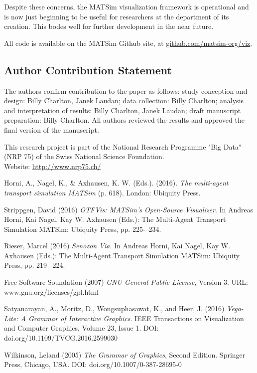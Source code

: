 \documentclass[Afour,sagev,times]{sagej}
\begin{document}
Despite these concerns, the MATSim visualization framework is operational and is now just beginning to be useful for researchers at the department of its creation. This bodes well for further development in the near future.

All code is available on the MATSim Github site, at \url{github.com/matsim-org/viz}.

\subsection{Author Contribution Statement}

The authors confirm contribution to the paper as follows: study conception and
design: Billy Charlton, Janek Laudan; data collection: Billy Charlton; analysis and
interpretation of results: Billy Charlton, Janek Laudan; draft manuscript
preparation: Billy Charlton. All authors reviewed the results and approved
the final version of the manuscript.


\begin{acks}
This research project is part of the National Research Programme "Big Data" (NRP 75) of the Swiss National Science Foundation.\\
Website: \url{http://www.nrp75.ch/}
\end{acks}


\begin{thebibliography}{99}

Horni, A., Nagel, K., \& Axhausen, K. W. (Eds.). (2016). \textit{The multi-agent transport simulation MATSim} (p. 618). London: Ubiquity Press.

Strippgen, David (2016) \textit{OTFVis: MATSim’s Open-Source Visualizer}. In Andreas Horni, Kai Nagel, Kay W. Axhausen (Eds.): The Multi-Agent Transport Simulation MATSim: Ubiquity Press, pp. 225-–234.

Rieser, Marcel (2016) \textit{Senozon Via}. In Andreas Horni, Kai Nagel, Kay W. Axhausen (Eds.): The Multi-Agent Transport Simulation MATSim: Ubiquity Press, pp. 219–-224.

Free Software Soundation (2007) \textit{GNU General Public License}, Version 3.
URL: www.gnu.org/licenses/gpl.html

Satyanarayan, A., Moritz, D., Wongsuphasawat, K., and Heer, J. (2016) \textit{Vega-Lite: A Grammar of Interactive Graphics}. IEEE Transactions on Visualization and Computer Graphics, Volume 23, Issue 1. DOI: doi.org/10.1109/TVCG.2016.2599030

Wilkinson, Leland (2005) \textit{The Grammar of Graphics}, Second Edition. Springer Press, Chicago, USA. DOI: doi.org/10.1007/0-387-28695-0

\end{thebibliography}
\end{document}
